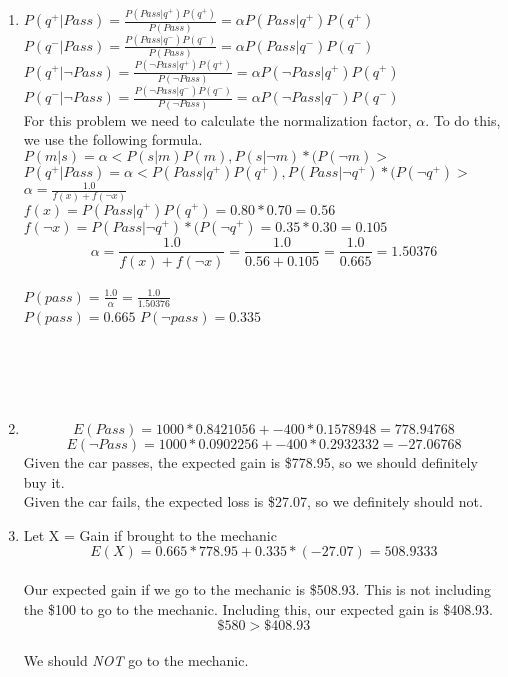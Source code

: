 \documentclass[12pt,a4paper]{report}
\begin{document}
\begin{enumerate}
\begin{enumerate}
	\item
	$P(q^{+}|Pass) = \frac{P(Pass|q^{+})P(q^{+})}{P(Pass)} = \alpha P(Pass|q^{+})P(q^{+})$\\
	$P(q^{-}|Pass) = \frac{P(Pass|q^{-})P(q^{-})}{P(Pass)} = \alpha P(Pass|q^{-})P(q^{-})$\\
	$P(q^{+}|\neg Pass) = \frac{P(\neg Pass|q^{+})P(q^{+})}{P(\neg Pass)} = \alpha P(\neg Pass|q^{+})P(q^{+})$\\
	$P(q^{-}|\neg Pass) = \frac{P(\neg Pass|q^{-})P(q^{-})}{P(\neg Pass)} = \alpha P(\neg Pass|q^{-})P(q^{-})$\\
	For this problem we need to calculate the normalization factor, $\alpha$. To do this, we use the following formula.\\
	$P(m|s)=\alpha <P(s|m)P(m),P(s|\neg m)*(P(\neg m)>$\\
	$P(q^{+}|Pass)=\alpha <P(Pass|q^{+})P(q^{+}),P(Pass|\neg q^{+})*(P(\neg q^{+})>$\\
	$\alpha = \frac{1.0}{f(x)+f(\neg x)}$\\
	$f(x) = P(Pass|q^{+})P(q^{+}) = 0.80*0.70 = 0.56$\\
	$f(\neg x) = P(Pass|\neg q^{+})*(P(\neg q^{+}) = 0.35 * 0.30 = 0.105$\\
	\[\alpha = \frac{1.0}{f(x)+f(\neg x)} = \frac{1.0}{0.56+0.105} = \frac{1.0}{0.665} = 1.50376\]\\
	$P(pass) = \frac{1.0}{\alpha} = \frac{1.0}{1.50376}$\\
	$P(pass) = 0.665$ $P(\neg pass) = 0.335$\\
	\\
	\\
	\\
	\\
	
	\item
	\[E(Pass) = 1000*0.8421056 + -400*0.1578948 = 778.94768\]
	\[E(\neg Pass) = 1000*0.0902256 + -400*0.2932332 = -27.06768\]
	Given the car passes, the expected gain is \$778.95, so we should definitely buy it.\\
	Given the car fails, the expected loss is \$27.07, so we definitely should not.\\
	
	\item
	Let X = Gain if brought to the mechanic
	\[E(X) = 0.665*778.95 + 0.335*(-27.07) = 508.9333 \]\\
	Our expected gain if we go to the mechanic is \$508.93. This is not including the \$100 to go to the mechanic. Including this, our expected gain is \$408.93.
	\[ \$580 > \$408.93 \]\\
	We should \textit{NOT} go to the mechanic.\\
	
\end{enumerate}

\end{enumerate}
\end{document}
